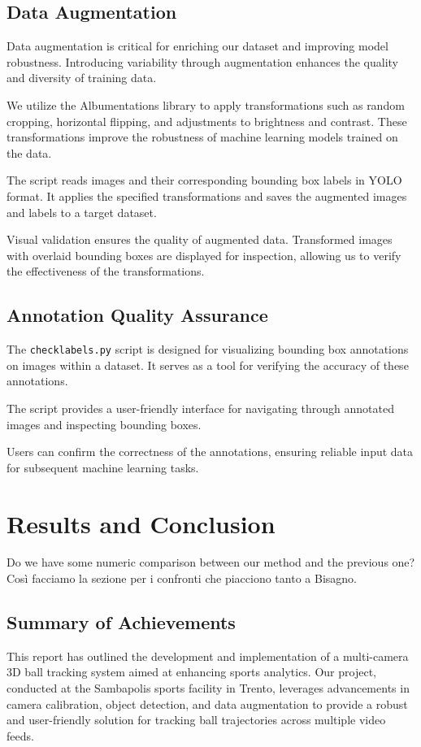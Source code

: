 \documentclass{template}
\begin{document}
\section{Data Augmentation}

Data augmentation is critical for enriching our dataset and improving model robustness. Introducing variability through augmentation enhances the quality and diversity of training data.

We utilize the Albumentations library to apply transformations such as random cropping, horizontal flipping, and adjustments to brightness and contrast. These transformations improve the robustness of machine learning models trained on the data.

The script reads images and their corresponding bounding box labels in YOLO format. It applies the specified transformations and saves the augmented images and labels to a target dataset.

Visual validation ensures the quality of augmented data. Transformed images with overlaid bounding boxes are displayed for inspection, allowing us to verify the effectiveness of the transformations.

\section{Annotation Quality Assurance}

The \texttt{checklabels.py} script is designed for visualizing bounding box annotations on images within a dataset. It serves as a tool for verifying the accuracy of these annotations.

The script provides a user-friendly interface for navigating through annotated images and inspecting bounding boxes.

Users can confirm the correctness of the annotations, ensuring reliable input data for subsequent machine learning tasks.

\chapter{Results and Conclusion}

Do we have some numeric comparison between our method and the previous one? Così facciamo la sezione per i confronti che piacciono tanto a Bisagno.
\cite{gulawani2006cfd}

\section{Summary of Achievements}
This report has outlined the development and implementation of a multi-camera 3D ball tracking system aimed at enhancing sports analytics. Our project, conducted at the Sambapolis sports facility in Trento, leverages advancements in camera calibration, object detection, and data augmentation to provide a robust and user-friendly solution for tracking ball trajectories across multiple video feeds.
\end{document}
